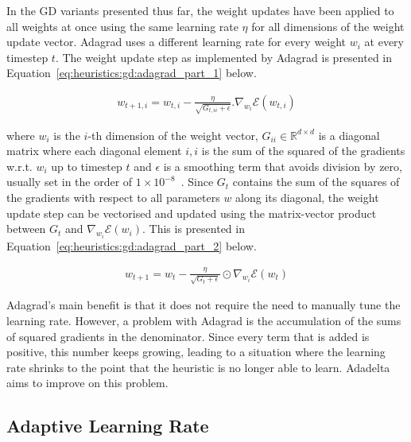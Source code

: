 In the \acs{GD} variants presented thus far, the weight updates have been applied to all weights at once using the same learning rate $\eta$ for all dimensions of the weight update vector. \Ac{Adagrad} uses a different learning rate for every weight $w_{i}$ at every timestep $t$. The weight update step as implemented by \ac{Adagrad} is presented in Equation~\ref{eq:heuristics:gd:adagrad_part_1} below.

\begin{equation}
      \label{eq:heuristics:gd:adagrad_part_1}
      \begin{split}
            w_{t+1,i} = w_{t,i} - \frac{\eta}{\sqrt{G_{t,ii} + \epsilon}}.\nabla_{w_{i}}\mathcal{E}(w_{t,i})
      \end{split}
\end{equation}

where $w_{i}$ is the $i$-th dimension of the weight vector, $G_{ii} \in \mathbb{R}^{d \times d}$ is a diagonal matrix where each diagonal element $i,i$ is the sum of the squared of the gradients w.r.t. $w_{i}$ up to timestep $t$ and $\epsilon$ is a smoothing term that avoids division by zero, usually set in the order of $1 \times 10^{-8}$~\cite{ref:ruder:2016}. Since $G_{t}$ contains the sum of the squares of the gradients with respect to all parameters $w$ along its diagonal, the weight update step can be vectorised and updated using the matrix-vector product between $G_{t}$ and $\nabla_{w_{i}}\mathcal{E}(w_{i})$. This is presented in Equation~\ref{eq:heuristics:gd:adagrad_part_2} below.

\begin{equation}
      \label{eq:heuristics:gd:adagrad_part_2}
      \begin{split}
            w_{t+1} = w_{t} - \frac{\eta}{\sqrt{G_{t} + \epsilon}} \odot \nabla_{w_{i}}\mathcal{E}(w_{t})
      \end{split}
\end{equation}

\Ac{Adagrad}'s main benefit is that it does not require the need to manually tune the learning rate. However, a problem with \ac{Adagrad} is the accumulation of the sums of squared gradients in the denominator. Since every term that is added is positive, this number keeps growing, leading to a situation where the learning rate shrinks to the point that the heuristic is no longer able to learn. \acl{Adadelta} aims to improve on this problem.

\subsection{Adaptive Learning Rate}
\label{sec:heuristics:adadelta}


